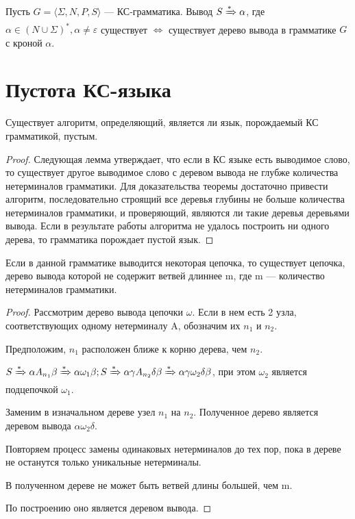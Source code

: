 \begin{theorem}
  Пусть $G = \langle \Sigma, N, P, S \rangle$ --- КС-грамматика.
  Вывод $S \xRightarrow[]{*} \alpha$, где $\alpha \in (N \cup \Sigma)^*, \alpha \neq \varepsilon$ существует $\Leftrightarrow$ существует дерево вывода в грамматике $G$ с кроной $\alpha$.
\end{theorem}

\section{Пустота КС-языка}

\begin{theorem}
  Существует алгоритм, определяющий, является ли язык, порождаемый КС грамматикой, пустым.
\end{theorem}

\begin{proof}
  Следующая лемма утверждает, что если в КС языке есть выводимое слово, то существует другое выводимое слово с деревом вывода не глубже количества нетерминалов грамматики.
  Для доказательства теоремы достаточно привести алгоритм, последовательно строящий все деревья глубины не больше количества нетерминалов грамматики, и проверяющий, являются ли такие деревья деревьями вывода.
  Если в результате работы алгоритма не удалось построить ни одного дерева, то грамматика порождает пустой язык.
\end{proof}

\begin{lemma}
  Если в данной грамматике выводится некоторая цепочка, то существует цепочка, дерево вывода которой не содержит ветвей длиннее m, где m --- количество нетерминалов грамматики.
\end{lemma}

\begin{proof}
  Рассмотрим дерево вывода цепочки $\omega$. Если в нем есть 2 узла, соответствующих одному нетерминалу A, обозначим их $n_1$ и $n_2$.

  Предположим, $n_1$ расположен ближе к корню дерева, чем $n_2$.

  $S \xRightarrow[]{*} \alpha A_{n_1} \beta \xRightarrow[]{*} \alpha \omega_1 \beta; S \xRightarrow[]{*} \alpha \gamma A_{n_2} \delta \beta \xRightarrow[]{*} \alpha \gamma \omega_2 \delta \beta$, при этом $\omega_2$ является подцепочкой $\omega_1$.

  Заменим в изначальном дереве узел $n_1$ на $n_2$. Полученное дерево является деревом вывода $\alpha \omega_2 \delta$.

  Повторяем процесс замены одинаковых нетерминалов до тех пор, пока в дереве не останутся только уникальные нетерминалы.

  В полученном дереве не может быть ветвей длины большей, чем m.

  По построению оно является деревом вывода.
\end{proof}



